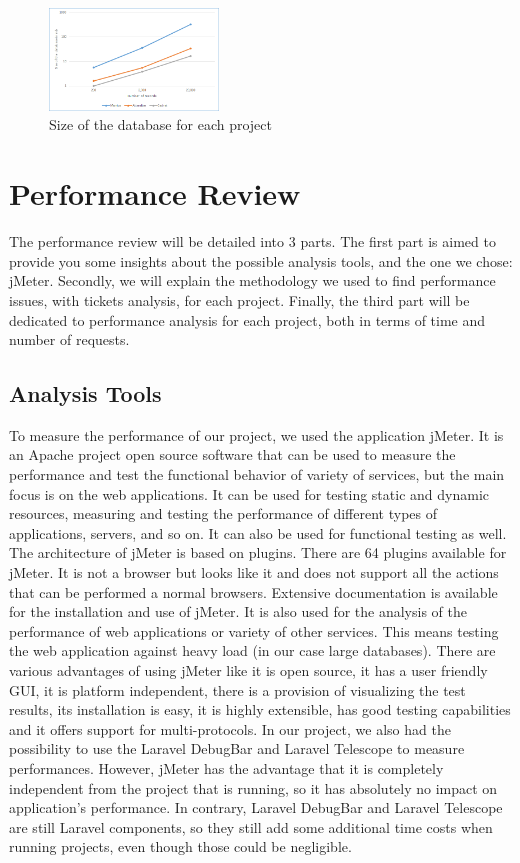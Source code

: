 \documentclass[sigconf]{acmart}
\begin{document}
\begin{figure}[t!]
\includegraphics[width=0.4\textwidth]{dbrecords}
\caption{Size of the database for each project}
\label{dbrecords}
\end{figure}

\section{Performance Review}
The performance review will be detailed into 3 parts. The first part is aimed to provide you some insights about the possible analysis tools, and the one we chose: jMeter. Secondly, we will explain the methodology we used to find performance issues, with tickets analysis, for each project. Finally, the third part will be dedicated to performance analysis for each project, both in terms of time and number of requests.

\subsection{Analysis Tools}
To measure the performance of our project, we used the application jMeter. It is an Apache project open source software that can be used to measure the performance and test the functional behavior of variety of services, but the main focus is on the web applications. It can be used for testing static and dynamic resources, measuring and testing the performance of different types of applications, servers, and so on. It can also be used for functional testing as well. The architecture of jMeter is based on plugins. There are 64 plugins available for jMeter. It is not a browser but looks like it and does not support all the actions that can be performed a normal browsers. Extensive documentation is available for the installation and use of jMeter. It is also used for the analysis of the performance of web applications or variety of other services. This means testing the web application against heavy load (in our case large databases). There are various advantages of using jMeter like it is open source, it has a user friendly GUI, it is platform independent, there is a provision of visualizing the test results, its installation is easy, it is highly extensible, has good testing capabilities and it offers support for multi-protocols. In our project, we also had the possibility to use the Laravel DebugBar and Laravel Telescope to measure performances. However, jMeter has the advantage that it is completely independent from the project that is running, so it has absolutely no impact on application's performance. In contrary, Laravel DebugBar and Laravel Telescope are still Laravel components, so they still add some additional time costs when running projects, even though those could be negligible.
\end{document}
